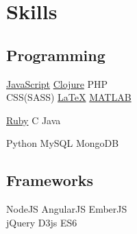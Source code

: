 \documentclass[letterpaper]{deedy-resume} %
\begin{document}
\begin{minipage}[t]{0.33\textwidth}
\section{Skills}

\subsection{Programming}

\href{http://github.com/charlespwd/mcgill-minerva-api}{JavaScript}
\textbullet{}
\href{http://github.com/charlespwd/bestcase}{Clojure}
\textbullet{}
PHP \\
CSS(SASS)
\textbullet{}
\href{http://github.com/charlespwd/tex-base}{\LaTeX}
\textbullet{}
\href{http://github.com/charlespwd/suture.m}{MATLAB} \\
\insectionspace

\href{http://github.com/charlespwd/grocery-list}{Ruby}
\textbullet{} C \textbullet{} Java

\insectionspace

Python \textbullet{} MySQL \textbullet{} MongoDB

\sectionspace %

\subsection{Frameworks}

NodeJS \textbullet{} AngularJS \textbullet{} EmberJS \\
jQuery \textbullet{} D3js \textbullet{} ES6 \\

\insectionspace
%
%
\sectionspace


\end{minipage} %
\hfill
%
%
\end{document}
